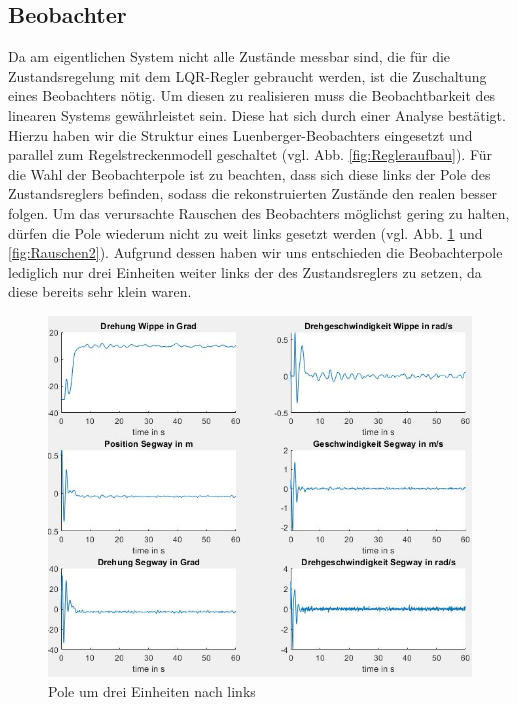 \documentclass[pdf]{ifacconf}
\begin{document}
	\subsection{Beobachter}
		Da am eigentlichen System nicht alle Zustände messbar sind, die für die Zustandsregelung 			mit dem LQR-Regler gebraucht werden, ist die Zuschaltung eines Beobachters nötig.
	Um diesen zu realisieren muss die Beobachtbarkeit des linearen Systems gewährleistet sein.
	Diese hat sich durch einer Analyse bestätigt.
	Hierzu haben wir die Struktur eines Luenberger-Beobachters eingesetzt und parallel zum            	Regelstreckenmodell geschaltet (vgl. Abb. \ref{fig:Regleraufbau}). Für die Wahl der Beobachterpole ist zu beachten, dass sich diese links der Pole des Zustandsreglers befinden, sodass die rekonstruierten Zustände den realen besser folgen. Um das verursachte Rauschen des Beobachters möglichst gering zu halten, dürfen die Pole wiederum nicht zu weit links gesetzt werden (vgl. Abb. \ref{fig:Rauschen1} und \ref{fig:Rauschen2}). Aufgrund dessen haben wir uns entschieden die Beobachterpole lediglich nur drei Einheiten weiter links der des Zustandsreglers zu setzen, da diese bereits sehr klein waren. 
	
	
	\begin{figure}[H]	
\centerline{\includegraphics[width=\linewidth]{Bilder/Regler1.jpg}}
	\caption{Pole um drei Einheiten nach links}	\label{fig:Rauschen1}
\end{figure}
\end{document}
